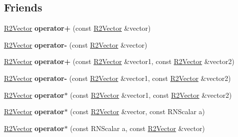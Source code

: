 \subsection*{Friends}
\begin{DoxyCompactItemize}
\item 
\hyperlink{class_r2_vector}{R2\+Vector} {\bfseries operator+} (const \hyperlink{class_r2_vector}{R2\+Vector} \&vector)\hypertarget{class_r2_vector_a423a3dc6059364fa119b9ef4c4500ae7}{}\label{class_r2_vector_a423a3dc6059364fa119b9ef4c4500ae7}

\item 
\hyperlink{class_r2_vector}{R2\+Vector} {\bfseries operator-\/} (const \hyperlink{class_r2_vector}{R2\+Vector} \&vector)\hypertarget{class_r2_vector_a462a9d162fe41976ead654702ae66017}{}\label{class_r2_vector_a462a9d162fe41976ead654702ae66017}

\item 
\hyperlink{class_r2_vector}{R2\+Vector} {\bfseries operator+} (const \hyperlink{class_r2_vector}{R2\+Vector} \&vector1, const \hyperlink{class_r2_vector}{R2\+Vector} \&vector2)\hypertarget{class_r2_vector_ab6caca78d0c35a4bfb9889df81e42f6c}{}\label{class_r2_vector_ab6caca78d0c35a4bfb9889df81e42f6c}

\item 
\hyperlink{class_r2_vector}{R2\+Vector} {\bfseries operator-\/} (const \hyperlink{class_r2_vector}{R2\+Vector} \&vector1, const \hyperlink{class_r2_vector}{R2\+Vector} \&vector2)\hypertarget{class_r2_vector_a3cbb3a606ba7bc8f570fbfc09f2e022a}{}\label{class_r2_vector_a3cbb3a606ba7bc8f570fbfc09f2e022a}

\item 
\hyperlink{class_r2_vector}{R2\+Vector} {\bfseries operator$\ast$} (const \hyperlink{class_r2_vector}{R2\+Vector} \&vector1, const \hyperlink{class_r2_vector}{R2\+Vector} \&vector2)\hypertarget{class_r2_vector_a9fa6329ad3f2b8b6e56a264c9c6d8fd2}{}\label{class_r2_vector_a9fa6329ad3f2b8b6e56a264c9c6d8fd2}

\item 
\hyperlink{class_r2_vector}{R2\+Vector} {\bfseries operator$\ast$} (const \hyperlink{class_r2_vector}{R2\+Vector} \&vector, const R\+N\+Scalar a)\hypertarget{class_r2_vector_acb46cbf083fffe9f0fc4b64873b92c81}{}\label{class_r2_vector_acb46cbf083fffe9f0fc4b64873b92c81}

\item 
\hyperlink{class_r2_vector}{R2\+Vector} {\bfseries operator$\ast$} (const R\+N\+Scalar a, const \hyperlink{class_r2_vector}{R2\+Vector} \&vector)\hypertarget{class_r2_vector_a87b38b6afcd8ca1191645b7dcf58fdfd}{}\label{class_r2_vector_a87b38b6afcd8ca1191645b7dcf58fdfd}


\end{DoxyCompactItemize}

